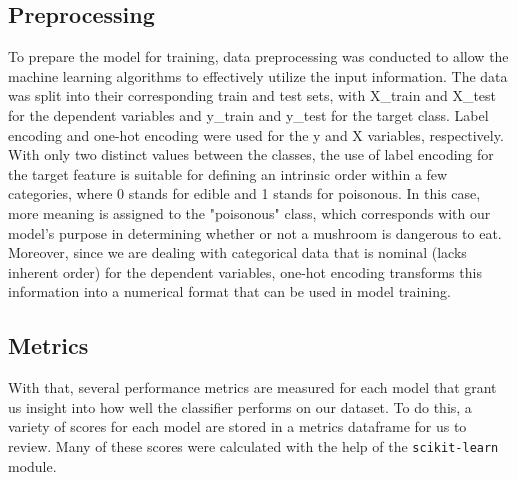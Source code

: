 \documentclass[11pt, conference]{IEEEtran}
\begin{document}
    \subsection{Preprocessing}
    To prepare the model for training, data preprocessing was conducted to allow the machine learning algorithms to effectively utilize the input information. The data was split into their corresponding train and test sets, with X\_train and X\_test for the dependent variables and y\_train and y\_test for the target class. Label encoding and one-hot encoding were used for the y and X variables, respectively. With only two distinct values between the classes, the use of label encoding for the target feature is suitable for defining an intrinsic order within a few categories, where 0 stands for edible and 1 stands for poisonous. In this case, more meaning is assigned to the "poisonous" class, which corresponds with our model's purpose in determining whether or not a mushroom is dangerous to eat. Moreover, since we are dealing with categorical data that is nominal (lacks inherent order) for the dependent variables, one-hot encoding transforms this information into a numerical format that can be used in model training.

    \subsection{Metrics}
    With that, several performance metrics are measured for each model that grant us insight into how well the classifier performs on our dataset. To do this, a variety of scores for each model are stored in a metrics dataframe for us to review. Many of these scores were calculated with the help of the \texttt{scikit-learn} module.
\end{document}
